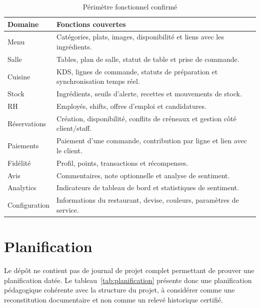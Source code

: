 \begin{table}[H]
\centering
\caption{Périmètre fonctionnel confirmé}
\label{tab:perimetre}
\begin{tabularx}{\textwidth}{p{3.2cm}Y}
\toprule
\textbf{Domaine} & \textbf{Fonctions couvertes} \\
\midrule
Menu & Catégories, plats, images, disponibilité et liens avec les ingrédients. \\
Salle & Tables, plan de salle, statut de table et prise de commande. \\
Cuisine & KDS, lignes de commande, statuts de préparation et synchronisation temps réel. \\
Stock & Ingrédients, seuils d'alerte, recettes et mouvements de stock. \\
RH & Employés, shifts, offres d'emploi et candidatures. \\
Réservations & Création, disponibilité, conflits de créneaux et gestion côté client/staff. \\
Paiements & Paiement d'une commande, contribution par ligne et lien avec le client. \\
Fidélité & Profil, points, transactions et récompenses. \\
Avis & Commentaires, note optionnelle et analyse de sentiment. \\
Analytics & Indicateurs de tableau de bord et statistiques de sentiment. \\
Configuration & Informations du restaurant, devise, couleurs, paramètres de service. \\
\bottomrule
\end{tabularx}
\end{table}

\section{Planification}
Le dépôt ne contient pas de journal de projet complet permettant de prouver une planification datée. Le tableau~\ref{tab:planification} présente donc une planification pédagogique cohérente avec la structure du projet, à considérer comme une reconstitution documentaire et non comme un relevé historique certifié.

